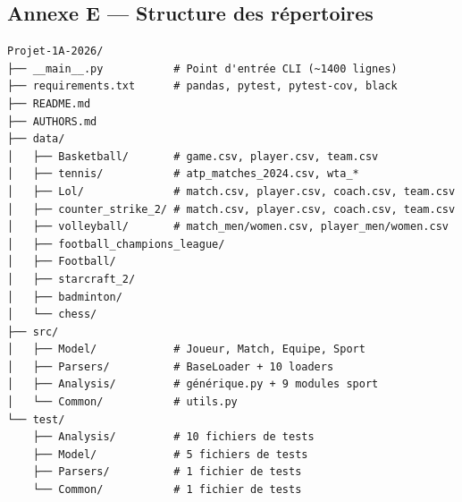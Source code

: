 \documentclass[12pt,a4paper]{article}
\begin{document}
\subsection*{Annexe E --- Structure des répertoires}

\begin{Verbatim}[fontsize=\small, frame=single]
Projet-1A-2026/
├── __main__.py           # Point d'entrée CLI (~1400 lignes)
├── requirements.txt      # pandas, pytest, pytest-cov, black
├── README.md
├── AUTHORS.md
├── data/
│   ├── Basketball/       # game.csv, player.csv, team.csv
│   ├── tennis/           # atp_matches_2024.csv, wta_*
│   ├── Lol/              # match.csv, player.csv, coach.csv, team.csv
│   ├── counter_strike_2/ # match.csv, player.csv, coach.csv, team.csv
│   ├── volleyball/       # match_men/women.csv, player_men/women.csv
│   ├── football_champions_league/
│   ├── Football/
│   ├── starcraft_2/
│   ├── badminton/
│   └── chess/
├── src/
│   ├── Model/            # Joueur, Match, Equipe, Sport
│   ├── Parsers/          # BaseLoader + 10 loaders
│   ├── Analysis/         # générique.py + 9 modules sport
│   └── Common/           # utils.py
└── test/
    ├── Analysis/         # 10 fichiers de tests
    ├── Model/            # 5 fichiers de tests
    ├── Parsers/          # 1 fichier de tests
    └── Common/           # 1 fichier de tests
\end{Verbatim}
\end{document}
